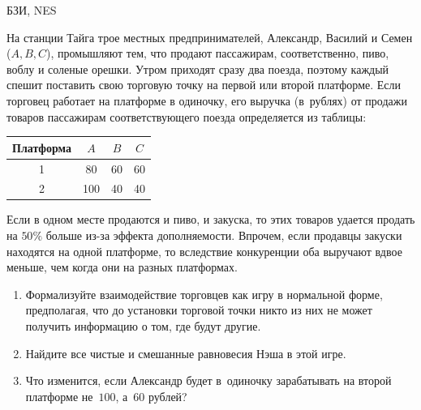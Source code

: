 \begin{problem}
\begin{source}
БЗИ, NES
\end{source} На станции Тайга трое
местных предпринимателей, Александр, Василий и Семен
($A,B,C$), промышляют тем, что продают пассажирам,
соответственно, пиво, воблу и соленые орешки. Утром
приходят сразу два поезда, поэтому каждый спешит поставить
свою торговую точку на первой или второй платформе. Если
торговец работает на платформе в одиночку, его выручка
(в~рублях) от продажи товаров пассажирам соответствующего
поезда определяется из таблицы:
\begin{center}
\begin{tabular}{|c|ccc|}
\hline Платформа&$A$&$B$&$C$\\ \hline 1&80&60&60\\ 2&100&40&40\\
\hline
\end{tabular}
\end{center}
Если в одном месте продаются и пиво, и закуска, то этих
товаров удается продать на $50\%$ больше из-за эффекта
дополняемости. Впрочем, если продавцы закуски находятся на
одной платформе, то вследствие конкуренции оба выручают
вдвое меньше, чем когда они на разных платформах.
\begin{enumerate}

\item Формализуйте взаимодействие торговцев как игру в
нормальной форме, предполагая, что до установки торговой
точки никто из них не может получить информацию о том, где
будут другие.

\item Найдите все чистые и смешанные равновесия Нэша в этой
игре.

\item Что изменится, если Александр будет в~одиночку
зарабатывать на второй платформе не~$100$, а~$60$ рублей?

\end{enumerate}







\begin{sol}

\end{sol}
\end{problem}




